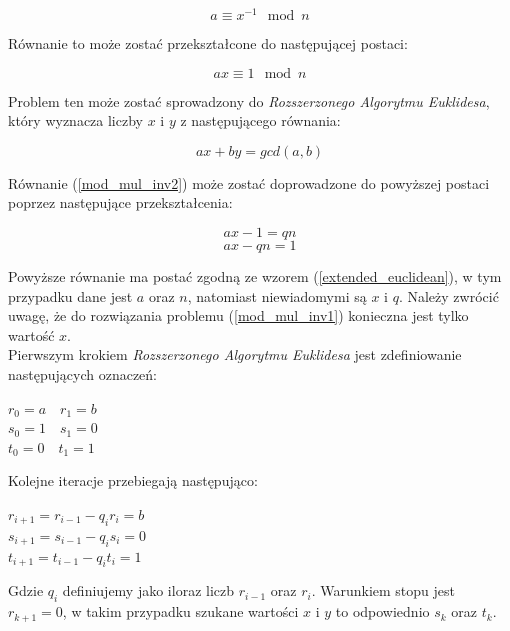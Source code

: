 \documentclass[10pt,a4paper]{article}
\begin{document}
\begin{equation} 
\label{mod_mul_inv1}
a \equiv x^{-1} \mod n
\end{equation}

Równanie to może zostać przekształcone do następującej postaci:

\begin{equation}
\label{mod_mul_inv2}
ax \equiv 1 \mod n
\end{equation}

Problem ten może zostać sprowadzony do \textit{Rozszerzonego Algorytmu Euklidesa}, który wyznacza liczby $x$ i $y$ z następującego równania:

\begin{equation}
\label{extended_euclidean}
ax + by = gcd(a,b)
\end{equation}

Równanie (\ref{mod_mul_inv2}) może zostać doprowadzone do powyższej postaci poprzez następujące przekształcenia:

\begin{equation}
ax - 1 = qn
\end{equation}
\begin{equation}
ax - qn = 1
\end{equation}

Powyższe równanie ma postać zgodną ze wzorem (\ref{extended_euclidean}), w tym przypadku dane jest $a$ oraz $n$, natomiast niewiadomymi są $x$ i $q$. Należy zwrócić uwagę, że do rozwiązania problemu (\ref{mod_mul_inv1}) konieczna jest tylko wartość $x$.\\

Pierwszym krokiem \textit{Rozszerzonego Algorytmu Euklidesa} jest zdefiniowanie następujących oznaczeń:

\begin{center}
$r_{0} = a \quad r_{1} = b$\\
$s_{0} = 1 \quad s_{1} = 0$\\
$t_{0} = 0 \quad t_{1} = 1$
\end{center}

Kolejne iteracje przebiegają następująco:

\begin{center}
$r_{i+1} = r_{i-1} - q_{i} r_{i} = b$\\
$s_{i+1} = s_{i-1} - q_{i} s_{i} = 0$\\
$t_{i+1} = t_{i-1} - q_{i} t_{i} = 1$
\end{center}

Gdzie $q_i$ definiujemy jako iloraz liczb $r_{i-1}$ oraz $r_i$. Warunkiem stopu jest $r_{k+1} = 0$, w takim przypadku szukane wartości $x$ i $y$ to odpowiednio $s_k$ oraz $t_k$. 
 
\end{document}
